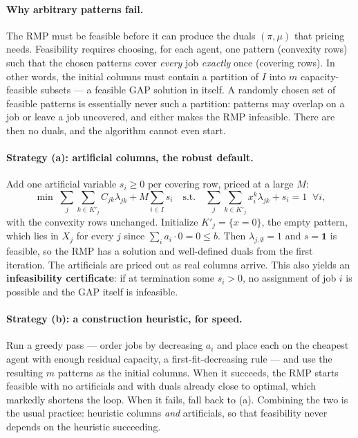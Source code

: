 \documentclass[11pt]{article}
\DeclareMathOperator*{\minimize}{min}
\theoremstyle{definition}
\theoremstyle{plain}
\begin{document}
\paragraph{Why arbitrary patterns fail.} The RMP must be feasible before
it can produce the duals $(\pi, \mu)$ that pricing needs. Feasibility
requires choosing, for each agent, one pattern (convexity rows) such
that the chosen patterns cover \emph{every} job \emph{exactly} once
(covering rows). In other words, the initial columns must contain a
partition of $I$ into $m$ capacity-feasible subsets --- a feasible GAP
solution in itself. A randomly chosen set of feasible patterns is
essentially never such a partition: patterns may overlap on a job or
leave a job uncovered, and either makes the RMP infeasible. There are
then no duals, and the algorithm cannot even start.

\paragraph{Strategy (a): artificial columns, the robust default.} Add
one artificial variable $s_i \ge 0$ per covering row, priced at a large
$M$:
\[
  \minimize \; \sum_{j}\sum_{k \in K'_j} C_{jk}\lambda_{jk}
    + M \sum_{i \in I} s_i
  \quad \text{s.t.} \quad
  \sum_{j}\sum_{k \in K'_j} x^k_i \lambda_{jk} + s_i = 1 \;\; \forall i,
\]
with the convexity rows unchanged. Initialize $K'_j = \{x = 0\}$, the
empty pattern, which lies in $X_j$ for every $j$ since
$\sum_i a_i \cdot 0 = 0 \le b$. Then $\lambda_{j,\emptyset} = 1$ and
$s = \mathbf{1}$ is feasible, so the RMP has a solution and well-defined
duals from the first iteration. The artificials are priced out as real
columns arrive. This also yields an \textbf{infeasibility certificate}:
if at termination some $s_i > 0$, no assignment of job $i$ is possible
and the GAP itself is infeasible.

\paragraph{Strategy (b): a construction heuristic, for speed.} Run a
greedy pass --- order jobs by decreasing $a_i$ and place each on the
cheapest agent with enough residual capacity, a first-fit-decreasing
rule --- and use the resulting $m$ patterns as the initial columns. When
it succeeds, the RMP starts feasible with no artificials and with duals
already close to optimal, which markedly shortens the loop. When it
fails, fall back to (a). Combining the two is the usual practice:
heuristic columns \emph{and} artificials, so that feasibility never
depends on the heuristic succeeding.
\end{document}
